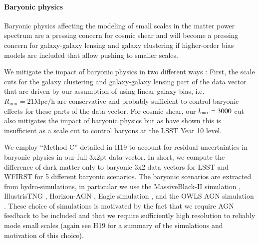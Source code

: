 \documentclass[fleqn,usenatbib,useAMS]{mnras}
\newcommand{\mr}{\mathrm}
\begin{document}
\paragraph*{Baryonic physics}
Baryonic physics affecting the modeling of small scales in the matter power spectrum \citep[e.g.][]{dsb11,crd18} are a pressing concern for cosmic shear \citep[see e.g.][]{shs11,zsd13,ekd15,her19} and will become a pressing concern for galaxy-galaxy lensing and galaxy clustering if higher-order bias models are included that allow pushing to smaller scales.

We mitigate the impact of baryonic physics in two different ways \citep[cf.][for an overview on mitigation strategies]{cmj19}: First, the scale cuts for the galaxy clustering and galaxy-galaxy lensing part of the data vector that are driven by our assumption of using linear galaxy bias, i.e. $R_\mr{\min}=21 \mr{ Mpc/h}$ are conservative and probably sufficient to control baryonic effects for these parts of the data vector. For cosmic shear, our $l_{\rm{max}} = 3000$ cut also mitigates the impact of baryonic physics but as \cite[][(H19 from hereon)]{her19} have shown this is insufficient as a scale cut to control baryons at the LSST Year 10 level. 

We employ ``Method C'' detailed in H19 to account for residual uncertainties in baryonic physics in our full 3x2pt data vector. In short, we compute the difference of dark matter only to baryonic 3x2 data vectors for LSST and WFIRST for 5 different baryonic scenarios. The baryonic scenarios are extracted from hydro-simulations, in particular we use the MassiveBlack-II simulation \citep{kdc15},  IllustrisTNG \citep{wsp18,psn18}, Horizon-AGN  \citep{dpp16}, Eagle simulation \citep{scb15} , and the OWLS AGN simulation \citep{sdb10,dsb11}.  
These choice of simulations is motivated by the fact that we require AGN feedback to be included and that we require sufficiently high resolution to reliably mode small scales (again see H19 for a summary of the simulations and motivation of this choice). 
\end{document}
